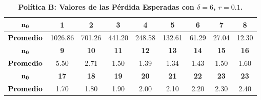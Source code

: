 \begin{table}[h!]\small
\centering
\caption{\bf Pol\'itica B: Valores de las P\'erdida  Esperadas con $\delta=6$, $r=0.1$.}\label{r11}
\begin{tabular}{ccccccccc}
\toprule[0.6mm]
$\bf{n_0}$ &\bf{1} &                   \bf{2} &                   \bf{3} &                   \bf{ 4 }&                    \bf{ 5}&              \bf{ 6} &               \bf{ 7} & \bf{8} \\
\hline
${\bf Promedio}$ &  
 1026.86 &  701.26 & 441.20 & 248.58 & 132.61  & 61.29 &  27.04&   12.30 \\
\hline
$\bf{n_0}$& \bf{9} &                \bf{ 10}&              \bf{      11} &                   \bf{ 12} &               \bf{      13}&              \bf{14} &  \bf{ 15} & \bf{16 }   \\
\hline
${\bf Promedio}$&	  5.50 &   2.71 &   1.50 &   1.39 &   1.34 &   1.43  &  1.50 &   1.60    \\
	 \hline
	
$\bf{n_0}$&\bf{17} &     \bf{ 18}&   \bf{19}&   \bf{ 20} &           \bf{   21}&                \bf{  22}  & \bf{23} & \bf{23}  \\
\hline
${\bf Promedio}$&    1.70  &1.80 &   1.90 &   2.00  &  2.10  &  2.20 &   2.30  &   2.40 \\
\toprule[0.6mm]
\end{tabular}

\end{table}





 

